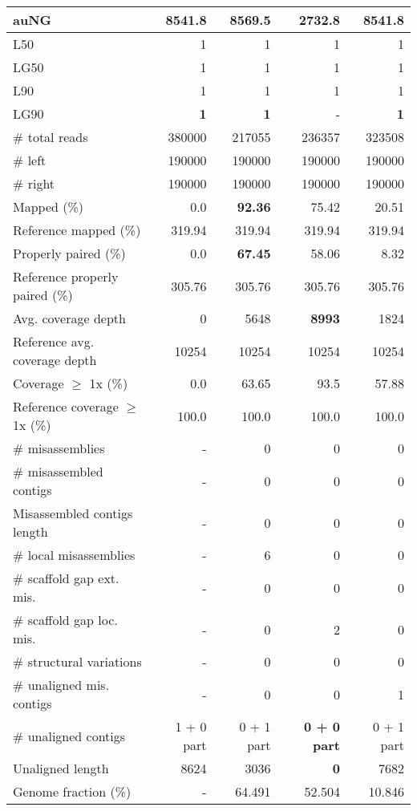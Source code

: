 \documentclass[12pt,a4paper]{article}
\begin{document}
\begin{table}[ht]
\begin{center}
\begin{tabular}{|l*{4}{|r}|}
auNG & 8541.8 & {\bf 8569.5} & 2732.8 & 8541.8 \\ \hline
L50 & 1 & 1 & 1 & 1 \\ \hline
LG50 & 1 & 1 & 1 & 1 \\ \hline
L90 & 1 & 1 & 1 & 1 \\ \hline
LG90 & {\bf 1} & {\bf 1} & - & {\bf 1} \\ \hline
\# total reads & 380000 & 217055 & 236357 & 323508 \\ \hline
\# left & 190000 & 190000 & 190000 & 190000 \\ \hline
\# right & 190000 & 190000 & 190000 & 190000 \\ \hline
Mapped (\%) & 0.0 & {\bf 92.36} & 75.42 & 20.51 \\ \hline
Reference mapped (\%) & 319.94 & 319.94 & 319.94 & 319.94 \\ \hline
Properly paired (\%) & 0.0 & {\bf 67.45} & 58.06 & 8.32 \\ \hline
Reference properly paired (\%) & 305.76 & 305.76 & 305.76 & 305.76 \\ \hline
Avg. coverage depth & 0 & 5648 & {\bf 8993} & 1824 \\ \hline
Reference avg. coverage depth & 10254 & 10254 & 10254 & 10254 \\ \hline
Coverage $\geq$ 1x (\%) & 0.0 & 63.65 & 93.5 & 57.88 \\ \hline
Reference coverage $\geq$ 1x (\%) & 100.0 & 100.0 & 100.0 & 100.0 \\ \hline
\# misassemblies & - & 0 & 0 & 0 \\ \hline
\# misassembled contigs & - & 0 & 0 & 0 \\ \hline
Misassembled contigs length & - & 0 & 0 & 0 \\ \hline
\# local misassemblies & - & 6 & 0 & 0 \\ \hline
\# scaffold gap ext. mis. & - & 0 & 0 & 0 \\ \hline
\# scaffold gap loc. mis. & - & 0 & 2 & 0 \\ \hline
\# structural variations & - & 0 & 0 & 0 \\ \hline
\# unaligned mis. contigs & - & 0 & 0 & 1 \\ \hline
\# unaligned contigs & 1 + 0 part & 0 + 1 part & {\bf 0 + 0 part} & 0 + 1 part \\ \hline
Unaligned length & 8624 & 3036 & {\bf 0} & 7682 \\ \hline
Genome fraction (\%) & - & 64.491 & 52.504 & 10.846 \\ \hline

\end{tabular}
\end{center}
\end{table}
\end{document}
